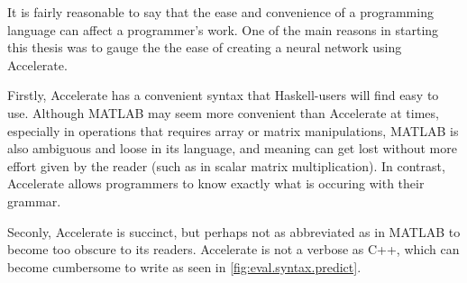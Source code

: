 It is fairly reasonable to say that the ease and convenience of a programming language can affect a programmer's work. One of the main reasons in starting this thesis was to gauge the the ease of creating a neural network using Accelerate.

Firstly, Accelerate has a convenient syntax that Haskell-users will find easy to use. Although MATLAB may seem more convenient than Accelerate at times, especially in operations that requires array or matrix manipulations, MATLAB is also ambiguous and loose in its language, and meaning can get lost without more effort given by the reader (such as in scalar matrix multiplication). In contrast, Accelerate allows programmers to know exactly what is occuring with their grammar. 

Seconly, Accelerate is succinct, but perhaps not as abbreviated as in MATLAB to become too obscure to its readers. Accelerate is not a verbose as C++, which can become cumbersome to write as seen in \ref{fig:eval.syntax.predict}.

